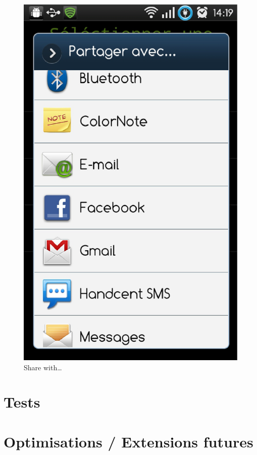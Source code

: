 \begin{figure}[H]
\centering
  \label{partage}
   \includegraphics[scale=0.4]{Images/partage.eps}
  \caption{Share with\ldots}
\end{figure}  



\section{Tests}

\section{Optimisations / Extensions futures}
